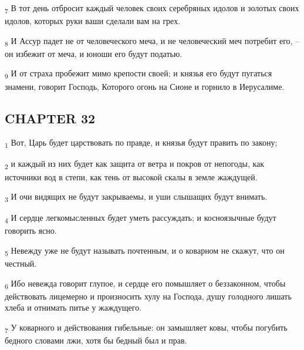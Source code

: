 \begin{tcolorbox}
\textsubscript{7} В тот день отбросит каждый человек своих серебряных идолов и золотых своих идолов, которых руки ваши сделали вам на грех.
\end{tcolorbox}
\begin{tcolorbox}
\textsubscript{8} И Ассур падет не от человеческого меча, и не человеческий меч потребит его, --он избежит от меча, и юноши его будут податью.
\end{tcolorbox}
\begin{tcolorbox}
\textsubscript{9} И от страха пробежит мимо крепости своей; и князья его будут пугаться знамени, говорит Господь, Которого огонь на Сионе и горнило в Иерусалиме.
\end{tcolorbox}
\subsection{CHAPTER 32}
\begin{tcolorbox}
\textsubscript{1} Вот, Царь будет царствовать по правде, и князья будут править по закону;
\end{tcolorbox}
\begin{tcolorbox}
\textsubscript{2} и каждый из них будет как защита от ветра и покров от непогоды, как источники вод в степи, как тень от высокой скалы в земле жаждущей.
\end{tcolorbox}
\begin{tcolorbox}
\textsubscript{3} И очи видящих не будут закрываемы, и уши слышащих будут внимать.
\end{tcolorbox}
\begin{tcolorbox}
\textsubscript{4} И сердце легкомысленных будет уметь рассуждать; и косноязычные будут говорить ясно.
\end{tcolorbox}
\begin{tcolorbox}
\textsubscript{5} Невежду уже не будут называть почтенным, и о коварном не скажут, что он честный.
\end{tcolorbox}
\begin{tcolorbox}
\textsubscript{6} Ибо невежда говорит глупое, и сердце его помышляет о беззаконном, чтобы действовать лицемерно и произносить хулу на Господа, душу голодного лишать хлеба и отнимать питье у жаждущего.
\end{tcolorbox}
\begin{tcolorbox}
\textsubscript{7} У коварного и действования гибельные: он замышляет ковы, чтобы погубить бедного словами лжи, хотя бы бедный был и прав.
\end{tcolorbox}
